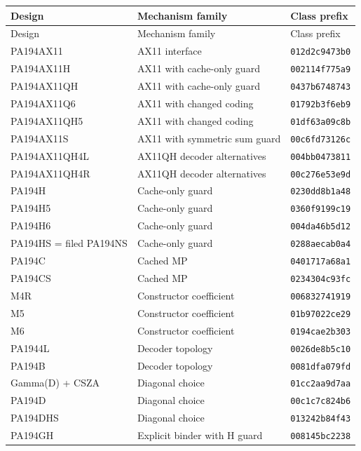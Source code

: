 \begingroup\footnotesize
\begin{longtable}{p{43mm}p{73mm}p{25mm}}
\toprule Design & Mechanism family & Class prefix\\\midrule\endfirsthead
\toprule Design & Mechanism family & Class prefix\\\midrule\endhead
\bottomrule\endfoot
PA194AX11 & AX11 interface & \texttt{012d2c9473b0}\\
PA194AX11H & AX11 with cache-only guard & \texttt{002114f775a9}\\
PA194AX11QH & AX11 with cache-only guard & \texttt{0437b6748743}\\
PA194AX11Q6 & AX11 with changed coding & \texttt{01792b3f6eb9}\\
PA194AX11QH5 & AX11 with changed coding & \texttt{01df63a09c8b}\\
PA194AX11S & AX11 with symmetric sum guard & \texttt{00c6fd73126c}\\
PA194AX11QH4L & AX11QH decoder alternatives & \texttt{004bb0473811}\\
PA194AX11QH4R & AX11QH decoder alternatives & \texttt{00c276e53e9d}\\
PA194H & Cache-only guard & \texttt{0230dd8b1a48}\\
PA194H5 & Cache-only guard & \texttt{0360f9199c19}\\
PA194H6 & Cache-only guard & \texttt{004da46b5d12}\\
PA194HS = filed PA194NS & Cache-only guard & \texttt{0288aecab0a4}\\
PA194C & Cached MP & \texttt{0401717a68a1}\\
PA194CS & Cached MP & \texttt{0234304c93fc}\\
M4R & Constructor coefficient & \texttt{006832741919}\\
M5 & Constructor coefficient & \texttt{01b97022ce29}\\
M6 & Constructor coefficient & \texttt{0194cae2b303}\\
PA1944L & Decoder topology & \texttt{0026de8b5c10}\\
PA194B & Decoder topology & \texttt{0081dfa079fd}\\
Gamma(D) + CSZA & Diagonal choice & \texttt{01cc2aa9d7aa}\\
PA194D & Diagonal choice & \texttt{00c1c7c824b6}\\
PA194DHS & Diagonal choice & \texttt{013242b84f43}\\
PA194GH & Explicit binder with H guard & \texttt{008145bc2238}\\

\end{longtable}
